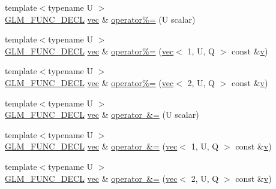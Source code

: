\begin{DoxyCompactItemize}
\item 
{\footnotesize template$<$typename U $>$ }\\\mbox{\hyperlink{setup_8hpp_ab2d052de21a70539923e9bcbf6e83a51}{G\+L\+M\+\_\+\+F\+U\+N\+C\+\_\+\+D\+E\+CL}} \mbox{\hyperlink{structglm_1_1vec}{vec}} \& \mbox{\hyperlink{structglm_1_1vec_3_012_00_01_t_00_01_q_01_4_a56d5575c010ab98d5fd63852ecaf0bcc}{operator\%=}} (U scalar)
\item 
{\footnotesize template$<$typename U $>$ }\\\mbox{\hyperlink{setup_8hpp_ab2d052de21a70539923e9bcbf6e83a51}{G\+L\+M\+\_\+\+F\+U\+N\+C\+\_\+\+D\+E\+CL}} \mbox{\hyperlink{structglm_1_1vec}{vec}} \& \mbox{\hyperlink{structglm_1_1vec_3_012_00_01_t_00_01_q_01_4_a4e0dc1a7c70bbb39328fb5f31a5b9bf0}{operator\%=}} (\mbox{\hyperlink{structglm_1_1vec}{vec}}$<$ 1, U, Q $>$ const \&\mbox{\hyperlink{_s_d_l__opengl_8h_a10a82eabcb59d2fcd74acee063775f90}{v}})
\item 
{\footnotesize template$<$typename U $>$ }\\\mbox{\hyperlink{setup_8hpp_ab2d052de21a70539923e9bcbf6e83a51}{G\+L\+M\+\_\+\+F\+U\+N\+C\+\_\+\+D\+E\+CL}} \mbox{\hyperlink{structglm_1_1vec}{vec}} \& \mbox{\hyperlink{structglm_1_1vec_3_012_00_01_t_00_01_q_01_4_afd83c730132c6344a400715a0f82c846}{operator\%=}} (\mbox{\hyperlink{structglm_1_1vec}{vec}}$<$ 2, U, Q $>$ const \&\mbox{\hyperlink{_s_d_l__opengl_8h_a10a82eabcb59d2fcd74acee063775f90}{v}})
\item 
{\footnotesize template$<$typename U $>$ }\\\mbox{\hyperlink{setup_8hpp_ab2d052de21a70539923e9bcbf6e83a51}{G\+L\+M\+\_\+\+F\+U\+N\+C\+\_\+\+D\+E\+CL}} \mbox{\hyperlink{structglm_1_1vec}{vec}} \& \mbox{\hyperlink{structglm_1_1vec_3_012_00_01_t_00_01_q_01_4_a554ee3843af2a7997a63333ee475b8f8}{operator \&=}} (U scalar)
\item 
{\footnotesize template$<$typename U $>$ }\\\mbox{\hyperlink{setup_8hpp_ab2d052de21a70539923e9bcbf6e83a51}{G\+L\+M\+\_\+\+F\+U\+N\+C\+\_\+\+D\+E\+CL}} \mbox{\hyperlink{structglm_1_1vec}{vec}} \& \mbox{\hyperlink{structglm_1_1vec_3_012_00_01_t_00_01_q_01_4_a0f1cfa1940438903f605b620a928ce38}{operator \&=}} (\mbox{\hyperlink{structglm_1_1vec}{vec}}$<$ 1, U, Q $>$ const \&\mbox{\hyperlink{_s_d_l__opengl_8h_a10a82eabcb59d2fcd74acee063775f90}{v}})
\item 
{\footnotesize template$<$typename U $>$ }\\\mbox{\hyperlink{setup_8hpp_ab2d052de21a70539923e9bcbf6e83a51}{G\+L\+M\+\_\+\+F\+U\+N\+C\+\_\+\+D\+E\+CL}} \mbox{\hyperlink{structglm_1_1vec}{vec}} \& \mbox{\hyperlink{structglm_1_1vec_3_012_00_01_t_00_01_q_01_4_a09a49ab5d55622ad568b054276c84786}{operator \&=}} (\mbox{\hyperlink{structglm_1_1vec}{vec}}$<$ 2, U, Q $>$ const \&\mbox{\hyperlink{_s_d_l__opengl_8h_a10a82eabcb59d2fcd74acee063775f90}{v}})

\end{DoxyCompactItemize}
